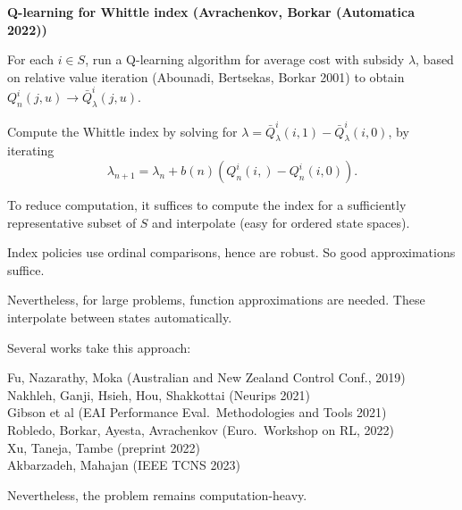 \documentclass{slides}
\begin{document}
{\newpage

\textbf{Q-learning for Whittle index (Avrachenkov, Borkar (Automatica 2022))}

For each $i\in S$, run a Q-learning algorithm for average cost with subsidy $\lambda$, based on relative value iteration (Abounadi, Bertsekas, Borkar 2001) to obtain $Q_n^i(j,u) \to \bar{Q}^i_\lambda(j,u)$.

Compute the Whittle index by solving for $\lambda = \bar{Q}^i_\lambda(i,1) - \bar{Q}_\lambda^i(i,0)$, by iterating
$$\lambda_{n+1} = \lambda_n + b(n)(Q^i_n(i,) - Q^i_n(i,0)).$$

\newpage

To reduce computation, it suffices to compute the index for a sufficiently representative subset of $S$ and interpolate (easy for ordered state spaces).

Index policies use {\color{red} ordinal comparisons}, hence are robust. So good approximations suffice.

Nevertheless, for large problems, function approximations are needed. These  interpolate between states automatically.

Several works take this approach:

\newpage

Fu, Nazarathy, Moka (Australian and New Zealand Control Conf., 2019)\\
Nakhleh, Ganji, Hsieh, Hou, Shakkottai (Neurips 2021)\\
Gibson et al (EAI Performance Eval.\ Methodologies and Tools  2021)\\
Robledo, Borkar, Ayesta, Avrachenkov (Euro.\ Workshop on RL, 2022)\\
Xu, Taneja, Tambe (preprint 2022)\\
Akbarzadeh, Mahajan (IEEE TCNS 2023)

Nevertheless, the problem remains computation-heavy.
}

\newpage
\end{document}
